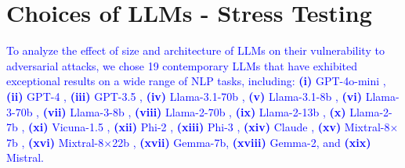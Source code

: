 



\section{Choices of LLMs - Stress Testing}

\textcolor{blue}{To analyze the effect of size and architecture of LLMs on their vulnerability to adversarial attacks, we chose 19 contemporary LLMs that have exhibited exceptional results on a wide range of NLP tasks, including: \textbf{(i)} GPT-4o-mini \cite{gpt-4o-mini}, \textbf{(ii)} GPT-4 \cite{gpt4}, \textbf{(iii)} GPT-3.5 \cite{gpt-3.5}, \textbf{(iv)} Llama-3.1-70b \cite{llama-3.1}, \textbf{(v)} Llama-3.1-8b \cite{llama-3.1}, \textbf{(vi)} Llama-3-70b \cite{llama-3}, \textbf{(vii)} Llama-3-8b \cite{llama-3}, \textbf{(viii)} Llama-2-70b \cite{llama-2}, \textbf{(ix)} Llama-2-13b \cite{llama-2}, \textbf{(x)} Llama-2-7b \cite{llama-2}, \textbf{(xi)} Vicuna-1.5 \cite{vicuna}, \textbf{(xii)} Phi-2 \cite{phi-2}, \textbf{(xiii)} Phi-3 \cite{phi-3}, \textbf{(xiv)} Claude \cite{claude}, \textbf{(xv)} Mixtral-8$\times$7b \cite{mixtral1}, \textbf{(xvi)} Mixtral-8$\times$22b \cite{mixtral2}, \textbf{(xvii)} Gemma-7b, \textbf{(xviii)} Gemma-2, and \textbf{(xix)} Mistral.}